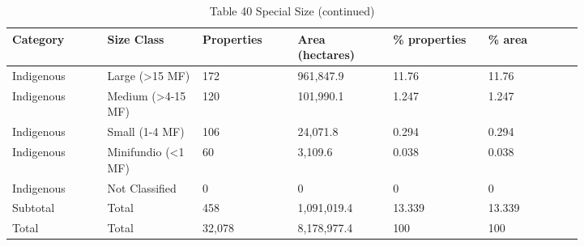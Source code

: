 \documentclass[12pt]{article}
\begin{document}
\begin{table}[H]
\centering
\caption{Table 40 Special Size (continued)}
{\fontsize{12}{14}\selectfont
\setlength{\tabcolsep}{3pt}
\renewcommand{\arraystretch}{1.08}
\begin{tabular}{p{0.137\linewidth}p{0.137\linewidth}p{0.137\linewidth}p{0.137\linewidth}p{0.137\linewidth}p{0.137\linewidth}}
\toprule
Category & Size Class & Properties & Area (hectares) & \% properties & \% area \\
\midrule
Indigenous & Large (>15 MF) & 172 & 961,847.9 & 11.76 & 11.76 \\
Indigenous & Medium (>4-15 MF) & 120 & 101,990.1 & 1.247 & 1.247 \\
Indigenous & Small (1-4 MF) & 106 & 24,071.8 & 0.294 & 0.294 \\
Indigenous & Minifundio (<1 MF) & 60 & 3,109.6 & 0.038 & 0.038 \\
Indigenous & Not Classified & 0 & 0 & 0 & 0 \\
Subtotal & Total & 458 & 1,091,019.4 & 13.339 & 13.339 \\
Total & Total & 32,078 & 8,178,977.4 & 100 & 100 \\
\bottomrule
\end{tabular}
}
\end{table}
\end{document}
